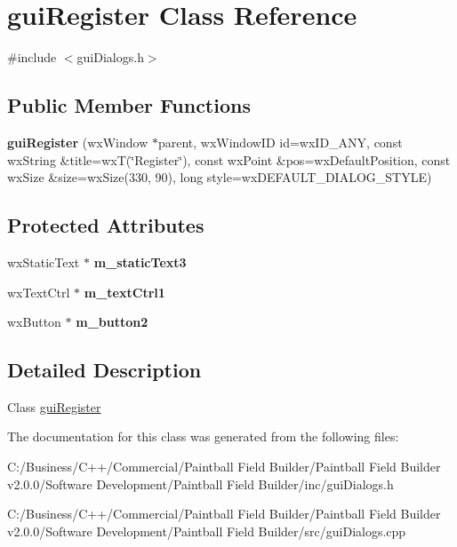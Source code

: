 \hypertarget{classgui_register}{
\section{guiRegister Class Reference}
\label{classgui_register}
}


{\ttfamily \#include $<$guiDialogs.h$>$}\subsection*{Public Member Functions}
\begin{DoxyCompactItemize}
\item 
\hypertarget{classgui_register_ac83c2ec352939fdabbefa291a5c28cee}{
{\bfseries guiRegister} (wxWindow $\ast$parent, wxWindowID id=wxID\_\-ANY, const wxString \&title=wxT(\char`\"{}Register\char`\"{}), const wxPoint \&pos=wxDefaultPosition, const wxSize \&size=wxSize(330, 90), long style=wxDEFAULT\_\-DIALOG\_\-STYLE)}
\label{classgui_register_ac83c2ec352939fdabbefa291a5c28cee}

\end{DoxyCompactItemize}
\subsection*{Protected Attributes}
\begin{DoxyCompactItemize}
\item 
\hypertarget{classgui_register_a9927d57725ae1f4d24dd6333da48f57c}{
wxStaticText $\ast$ {\bfseries m\_\-staticText3}}
\label{classgui_register_a9927d57725ae1f4d24dd6333da48f57c}

\item 
\hypertarget{classgui_register_a740a836d54da466adddf59a9fb4e119a}{
wxTextCtrl $\ast$ {\bfseries m\_\-textCtrl1}}
\label{classgui_register_a740a836d54da466adddf59a9fb4e119a}

\item 
\hypertarget{classgui_register_a939d02b523fc256bdd3313b43eb1926d}{
wxButton $\ast$ {\bfseries m\_\-button2}}
\label{classgui_register_a939d02b523fc256bdd3313b43eb1926d}

\end{DoxyCompactItemize}


\subsection{Detailed Description}
Class \hyperlink{classgui_register}{guiRegister} 

The documentation for this class was generated from the following files:\begin{DoxyCompactItemize}
\item 
C:/Business/C++/Commercial/Paintball Field Builder/Paintball Field Builder v2.0.0/Software Development/Paintball Field Builder/inc/guiDialogs.h\item 
C:/Business/C++/Commercial/Paintball Field Builder/Paintball Field Builder v2.0.0/Software Development/Paintball Field Builder/src/guiDialogs.cpp\end{DoxyCompactItemize}
